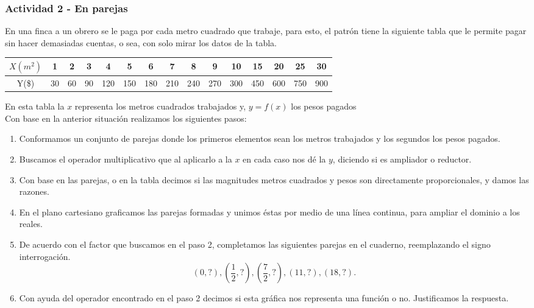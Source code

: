 \documentclass[10pt]{article}
\begin{document}
\subsubsection*{Actividad 2 - En parejas}
En una finca a un obrero se le paga por cada metro cuadrado que trabaje, para esto, el patrón tiene la siguiente tabla que le permite pagar sin hacer demasiadas cuentas, o sea, con solo mirar los datos de la tabla.
\begin{center}
\begin{tabular}{|c|c|c|c|c|c|c|c|c|c|c|c|c|c|c|}
\hline 
$X(m^{2})$ & 1 & 2 & 3 & 4 & 5 & 6 & 7 & 8 & 9 & 10 & 15 & 20 & 25 & 30 \\ 
\hline 
Y(\$) & 30 & 60 & 90 & 120 & 150 & 180 & 210 & 240 & 270 & 300 & 450 & 600 & 750 & 900 \\ 
\hline 
\end{tabular} 
\end{center}
En esta tabla la $x$ representa los metros cuadrados trabajados y, $y=f(x)$ los pesos pagados\\

Con base en la anterior situación realizamos los siguientes pasos:
\begin{enumerate}
\item Conformamos un conjunto de parejas donde los primeros elementos sean los metros trabajados y los segundos los pesos pagados.
\item Buscamos el operador multiplicativo que al aplicarlo a la $x$ en cada caso nos dé la $y$, diciendo si es ampliador o reductor.
\item Con base en las parejas, o en la tabla decimos si las magnitudes metros cuadrados y pesos son directamente proporcionales, y damos las razones.
\item En el plano cartesiano graficamos las parejas formadas y unimos éstas por medio de una línea continua, para ampliar el dominio a los reales.
\item De acuerdo con el factor que buscamos en el paso 2, completamos las siguientes parejas en el cuaderno, reemplazando el signo interrogación.
\[(0,?),\left(\frac{1}{2},?\right),\left(\frac{7}{2},?\right),(11,?),(18,?).\]
\item Con ayuda del operador encontrado en el paso 2 decimos si esta gráfica nos representa una función o no. Justificamos la respuesta.
\end{enumerate}
\end{document}
